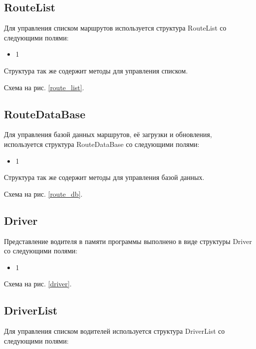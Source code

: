 \subsection{RouteList}

Для управления списком маршрутов используется структура RouteList со следующими полями:

\begin{itemize}
    \item 1
\end{itemize}

Структура так же содержит методы для управления списком.

Схема на рис. \ref{route_list}.


\subsection{RouteDataBase}

Для управления базой данных маршрутов, 
её загрузки и обновления, 
используется структура RouteDataBase со следующими полями: 

\begin{itemize}
    \item 1
\end{itemize}

Структура так же содержит методы для управления базой данных.

Схема на рис. \ref{route_db}.


\subsection{Driver}

Представление водителя в памяти программы выполнено в виде структуры Driver со следующими полями:

\begin{itemize}
    \item 1
\end{itemize}

Схема на рис. \ref{driver}.


\subsection{DriverList}

Для управления списком водителей используется структура DriverList со следующими полями:

